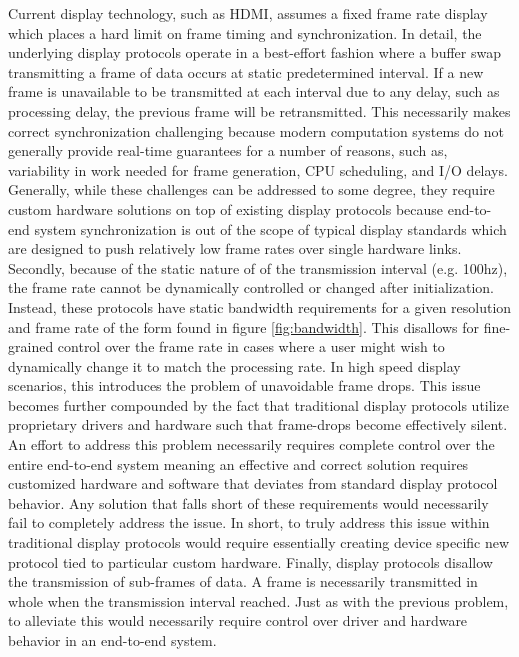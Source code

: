 Current display technology, such as HDMI, assumes a fixed frame rate display which places a hard limit on frame timing and synchronization. In detail, the underlying display protocols operate in a best-effort fashion where a buffer swap transmitting a frame of data occurs at static predetermined interval. If a new frame is unavailable to be transmitted at each interval due to any delay, such as processing delay, the previous frame will be retransmitted. This necessarily makes correct synchronization challenging because modern computation systems do not generally provide real-time guarantees for a number of reasons, such as, variability in work needed for frame generation, CPU scheduling, and I/O delays. Generally, while these challenges can be addressed to some degree, they require custom hardware solutions on top of existing display protocols because end-to-end system synchronization is out of the scope of typical display standards which are designed to push relatively low frame rates over single hardware links. Secondly, because of the static nature of of the transmission interval (e.g. 100hz), the frame rate cannot be dynamically controlled or changed after initialization. Instead, these protocols have static bandwidth requirements for a given resolution and frame rate of the form found in figure \ref{fig:bandwidth}. This disallows for fine-grained control over the frame rate in cases where a user might wish to dynamically change it to match the processing rate. In high speed display scenarios, this introduces the problem of unavoidable frame drops. This issue becomes further compounded by the fact that traditional display protocols utilize proprietary drivers and hardware such that frame-drops become effectively silent. An effort to address this problem necessarily requires complete control over the entire end-to-end system meaning an effective and correct solution requires customized hardware and software that deviates from standard display protocol behavior. Any solution that falls short of these requirements would necessarily fail to completely address the issue. In short, to truly address this issue within traditional display protocols would require essentially creating device specific new protocol tied to particular custom hardware. Finally, display protocols disallow the transmission of sub-frames of data. A frame is necessarily transmitted in whole when the transmission interval reached. Just as with the previous problem, to alleviate this would necessarily require control over driver and hardware behavior in an end-to-end system.

